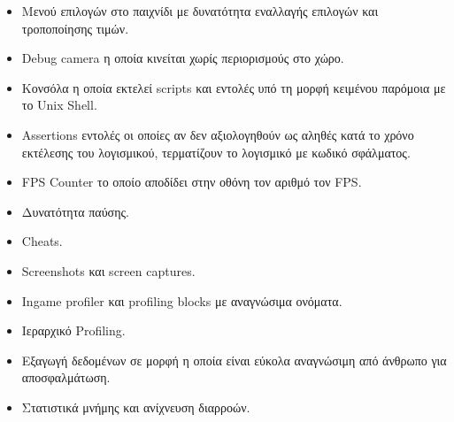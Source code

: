 \begin{itemize}
	\item Μενού επιλογών στο παιχνίδι με δυνατότητα εναλλαγής επιλογών και τροποποίησης τιμών.
	\item Debug camera η οποία κινείται χωρίς περιορισμούς στο χώρο.
	\item Κονσόλα η οποία εκτελεί scripts και εντολές υπό τη μορφή κειμένου παρόμοια με το Unix Shell.
	\item Assertions εντολές οι οποίες αν δεν αξιολογηθούν ως αληθές κατά το χρόνο εκτέλεσης του λογισμικού, τερματίζουν το λογισμικό με κωδικό σφάλματος.
	\item FPS Counter το οποίο αποδίδει στην οθόνη τον αριθμό τον \gls{FPS}.
	\item Δυνατότητα παύσης.
	\item Cheats.
	\item Screenshots και screen captures.
	\item Ιngame profiler και profiling blocks με αναγνώσιμα ονόματα.
	\item Ιεραρχικό Profiling.
	\item Εξαγωγή δεδομένων σε μορφή η οποία είναι εύκολα αναγνώσιμη από άνθρωπο για αποσφαλμάτωση.
	\item Στατιστικά μνήμης και ανίχνευση διαρροών.
\end{itemize}